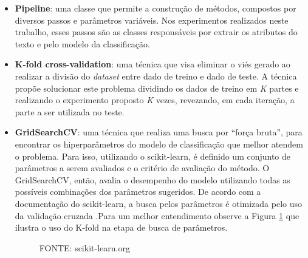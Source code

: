 \begin{itemize}
    \item \textbf{Pipeline}: uma classe que permite a construção de métodos, compostos por diversos passos e parâmetros variáveis. Nos experimentos realizados neste trabalho, esses passos são as classes responsáveis por extrair os atributos do texto e pelo modelo da classificação.
    \item \textbf{K-fold cross-validation}: uma técnica que visa eliminar o viés gerado ao realizar a divisão do \textit{dataset} entre dado de treino e dado de teste. A técnica propõe solucionar este problema dividindo os dados de treino em \textit{K} partes e realizando o experimento proposto \textit{K} vezes, revezando, em cada iteração, a parte a ser utilizada no teste.

   \item \textbf{GridSearchCV}: uma técnica que realiza uma busca por “força bruta”, para encontrar os hiperparâmetros do modelo de classificação que melhor atendem o problema. Para isso, utilizando o scikit-learn, é definido um conjunto de parâmetros a serem avaliados e o critério de avaliação do método. O GridSearchCV, então, avalia o desempenho do modelo utilizando todas as possíveis combinações dos parâmetros sugeridos. De acordo com a documentação do scikit-learn, a busca pelos parâmetros é otimizada pelo uso da validação cruzada \cite{scikit-learn}.Para um melhor entendimento observe a Figura \ref{kfold} que ilustra o uso do K-fold na etapa de busca de parâmetros.


\begin{figure}[!htb]
    \caption{FONTE: scikit-learn.org}
    \label{kfold}
\end{figure}

\end{itemize}

